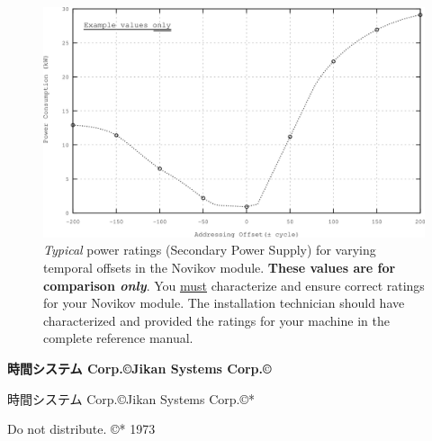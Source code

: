 \documentclass[a4paper,onecolumn,final,10pt]{memoir}
\makeatletter
\let\@copyright@old\copyright
\def\@copyright@new{\makebox[.6ex][l]{\hspace{-.4ex}\textsuperscript{\@copyright@old}}}
\def\copyright{\@ifstar\@copyright@old\@copyright@new}
\def\@companyname@english{Jikan Systems Corp.\copyright}
\def\@companyname@japanese{時間システム Corp.\copyright}
\def\companyname{\@ifstar\@companyname@japanese\@companyname@english}
\makeatother
\begin{document}
\begin{figure}
	\centerline{%
		\includegraphics{assets/novikov-power.png}%
	}
	\caption{\emph{Typical} power ratings (Secondary Power Supply) for varying temporal
		offsets in the Novikov module. \textbf{These values are for comparison
			\emph{only}}. You \underline{must} characterize and ensure correct
		ratings for your Novikov module. The installation technician should have
		characterized and provided the ratings for your machine in the complete
		reference manual.}
	\label{fig:novikov-power}
\end{figure}

\clearpage
\thispagestyle{empty}
\null\vfill
{\bfseries
	\null\hfill\companyname{}\hfill\null

	\null\hfill\companyname*{}\hfill\null}
\vfill\null

\centerline{\ttfamily Do not distribute. \copyright*{} 1973}
\end{document}
